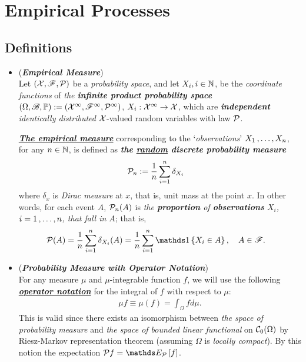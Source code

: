 \documentclass[11pt]{article}
\begin{document}
\section{Empirical Processes}
\subsection{Definitions}
\begin{itemize}
\item \begin{definition}(\textbf{\emph{Empirical Measure}})  \citep{wellner2013weak, gine2021mathematical} \\
Let $({\mathcal X}, {\mathscr F}, {\mathcal P})$ be a \emph{probability space}, and let $X_i, i \in {\mathbb N}$, be the \emph{coordinate functions} of \emph{the \textbf{infinite product probability space}} $(\Omega, {\mathscr B},  {\mathbb P}) := ({\mathcal X}^{\infty}, {\mathscr F}^{\infty}, {\mathcal P}^{\infty})$,  $X_i :  {\mathcal X}^{\infty} \to {\mathcal X}$, which are \emph{\textbf{independent} identically distributed} ${\mathcal X}$-valued random variables with law ${\mathcal P}$. %

\underline{\emph{\textbf{The empirical measure}}} corresponding to the `\emph{observations}' $X_1 \,{,}\ldots{,}\, X_n$, for any $n \in {\mathbb N}$, is defined as \emph{\textbf{the \underline{random} discrete probability measure}}
\begin{align}
{\mathcal P}_n &:= \frac{1}{n}\sum_{i=1}^{n}\delta_{X_i} \label{def: empirical_measure}
\end{align} where $\delta_x$ is \emph{Dirac measure} at $x$, that is, unit mass at the point $x$.  In other words, for each event $A$,  ${\mathcal P}_n(A)$ is \emph{the \textbf{proportion} of \textbf{observations} $X_i$,  $i = 1 \,{,}\ldots{,}\, n$, that fall in $A$}; that is,
\begin{align*}
\cP(A) &= \frac{1}{n}\sum_{i=1}^{n}\delta_{X_i}(A) = \frac{1}{n}\sum_{i=1}^{n}\ind{X_i \in A}, \quad A \in \srF.
\end{align*}
\end{definition}

\item \begin{remark}(\textbf{\emph{Probability Measure with Operator Notation}}) \citep{wellner2013weak, gine2021mathematical} \\
For any measure $\mu$ and $\mu$-integrable function $f$, we will use the following \underline{\textbf{\emph{operator notation}}} for the integral of $f$ with respect to $\mu$:
\begin{align*}
\mu f \equiv \mu(f) =  \int_{\Omega} f d\mu.
\end{align*} This is valid since there exists an isomorphism between \emph{the space of probability measure} and \emph{the space of bounded linear functional} on ${\mathcal C}_{0}(\Omega)$ by Riesz-Markov representation theorem (assuming $\Omega$ is \emph{locally compact}). By this notion the expectation $ \cP f = \E{\cP}{f}$.
\end{remark}


\end{itemize}
\end{document}
